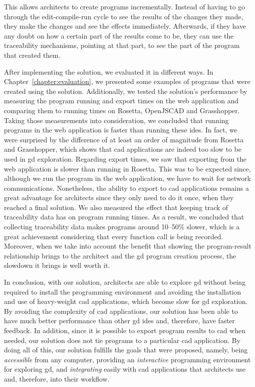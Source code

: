 This allows architects to create programs incrementally.
Instead of having to go through the edit-compile-run cycle to see the results of the changes they made, they make the changes and see the effects immediately.
Afterwards, if they have any doubt on how a certain part of the results come to be, they can use the traceability mechanisms, pointing at that part, to see the part of the program that created them.

After implementing the solution, we evaluated it in different ways.
In Chapter~\ref{chapter:evaluation}, we presented some examples of programs that were created using the solution.
Additionally, we tested the solution's performance by measuring the program running and export times on the web application and comparing them to running times on Rosetta, OpenJSCAD and Grasshopper.
Taking those measurements into consideration, we concluded that running programs in the web application is faster than running these \glspl{ide}.
In fact, we were surprised by the difference of at least an order of magnitude from Rosetta and Grasshopper, which shows that \gls{cad} applications are indeed too slow to be used in \gls{gd} exploration.
Regarding export times, we saw that exporting from the web application is slower than running in Rosetta.
This was to be expected since, although we run the program in the web application, we have to wait for network communications.
Nonetheless, the ability to export to \gls{cad} applications remains a great advantage for architects since they only need to do it once, when they reached a final solution.
We also measured the effect that keeping track of traceability data has on program running times.
As a result, we concluded that collecting traceability data makes programs around 10--50\% slower, which is a great achievement considering that every function call is being recorded.
Moreover, when we take into account the benefit that showing the program-result relationship brings to the architect and the \gls{gd} program creation process, the slowdown it brings is well worth it.

In conclusion, with our solution, architects are able to explore \gls{gd} without being required to install the programming environment and avoiding the installation and use of heavy-weight \gls{cad} applications, which become slow for \gls{gd} exploration.
By avoiding the complexity of \gls{cad} applications, our solution has been able to have much better performance than other \gls{gd} \glspl{ide} and, therefore, have faster feedback.
In addition, since it is possible to export program results to \gls{cad} when needed, our solution does not tie programs to a particular \gls{cad} application.
By doing all of this, our solution fulfills the goals that were proposed, namely, being \textit{accessible} from any computer, providing an \textit{interactive} programming environment for exploring \gls{gd}, and \textit{integrating} easily with \gls{cad} applications that architects use and, therefore, into their workflow.

